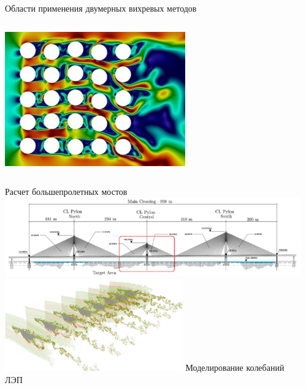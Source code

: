 \documentclass[ignoreonframetext,unicode]{beamer}
\begin{document}
\begin{frame}{Области применения двумерных вихревых методов}
\begin{columns}
\begin{columns}
					\includegraphics[width=\textwidth]{ris2}
				\end{columns}
		\end{columns}
		\begin{columns}
			Расчет большепролетных мостов
				\includegraphics[width=\textwidth]{ris3}
				\includegraphics[width=0.6\textwidth]{ris4}
			Моделирование колебаний ЛЭП
			\begin{columns}

\end{columns}
\end{columns}
\end{frame}
\end{document}
